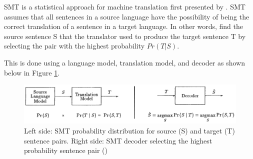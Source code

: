 

\acrfull{SMT} is a statistical approach for machine translation first presented by \cite{brown_statistical_1990}. 
\acrshort{SMT} assumes that all sentences in a source language have the possibility of being the correct translation of a sentence in a target language. 
In other words, find the source sentence S that the translator used to produce the target sentence T by selecting the pair with the highest probability $Pr ( T | S )$.

This is done using a language model, translation model, and decoder
as shown below in Figure \ref{fig:smt_diagram}.

\begin{figure}[ht!]
\centering
\includegraphics[width=1\textwidth]{media/literature/machine_translation/smt_3.png}
\caption[Diagram of \acrshort{SMT} probability distribution and decoder]{Left side: \acrshort{SMT} probability distribution for source (S) and target (T) sentence pairs. Right side: \acrshort{SMT} decoder selecting the highest probability sentence pair (\cite{brown_statistical_1990})}
\label{fig:smt_diagram}
\end{figure}







